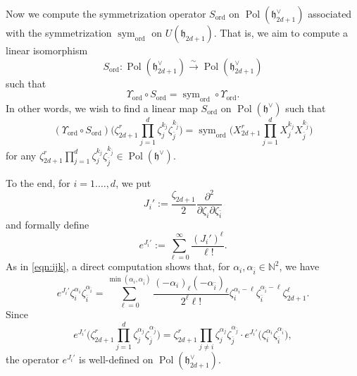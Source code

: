 \documentclass[a4paper,11pt,reqno]{amsart}
\newcommand{\frakh}{\mathfrak{h}}
\newcommand{\0}{{\bf 0}}
\newcommand{\N}{\mathbb{N}}
\newcommand{\1}{{\bf 1}}
\DeclareMathOperator{\Pol}{Pol}
\newcommand{\ord}{{\mathrm{ord}}}
\DeclareMathOperator{\To}{\longrightarrow}
\DeclareMathOperator{\sym}{sym}
\theoremstyle{plain}
\theoremstyle{definition}
\numberwithin{equation}{section}
\theoremstyle{definition}
\begin{document}
\begin{appendices}
Now we compute the symmetrization operator 
$S_{\ord}$ on  
$\Pol(\frakh_{2d+1}^\vee)$ associated with the symmetrization
$\sym_\ord$ on $U(\frakh_{2d+1})$. That is, we aim to compute
a linear isomorphism
\begin{equation*}
S_{\ord} \colon 
\Pol(\frakh_{2d+1}^\vee) \stackrel{\sim}{\To} \Pol(\frakh_{2d+1}^\vee)
\end{equation*}
 such that
\begin{equation*}
\Upsilon_{\ord} \circ S_{\ord}=
\sym_{\ord} \circ \Upsilon_{\ord}.
\end{equation*}
In other words, we wish to find a linear map
$S_{\ord}$ on $\Pol(\frakh^\vee)$
such that
\begin{equation*}
(\Upsilon_{\ord} 
\circ
S_{\ord} )
\Big(
\zeta_{2d+1}^r
\prod_{j=1}^d
\zeta_j^{k_j}\zeta_{\bar{j}}^{k_{\bar{j}}}
\Big)
=
\sym_{\ord}\big(X_{2d+1}^r\prod_{j=1}^{d}X_j^{k_j}X_{\bar{j}}^{k_{\bar{j}}} \big)
\end{equation*}
for any $\zeta_{2d+1}^r
\prod_{j=1}^d
\zeta_j^{k_j}\zeta_{\bar{j}}^{k_{\bar{j}}} \in \Pol(\frakh^\vee)$.

To the end, for $i=1.\ldots, d$, we put
\begin{equation*}
J_i'
:=
\frac{\zeta_{2d+1}}{2}\frac{\partial^2}{\partial\zeta_{i}\partial\zeta_{\bar{i}}}
\end{equation*}
and 
formally define
\begin{equation*}
e^{J_i'}:=\sum_{\ell=0}^\infty \frac{(J_{i}')^\ell}{\ell!}.
\end{equation*}
As in \eqref{eqn:ijk}, a direct computation shows that,
for $\alpha_i, \alpha_{\bar{i}} \in \N^2$, we have 
\begin{equation}\label{appendix:ijk}
e^{J_{i}'}
\zeta_i^{\alpha_i}\zeta_{\bar{i}}^{\alpha_{\bar{i}}}
=\sum_{\ell=0}^{\min(\alpha_i,\alpha_{\bar{i}})}
 \frac{(-\alpha_i)_\ell(-\alpha_{\bar{i}})_\ell}{2^\ell \ell!}
\zeta_i^{\alpha_i-\ell}\zeta_{\bar{i}}^{\alpha_{\bar{i}}-\ell}\zeta_{2d+1}^{\ell}.
\end{equation}
Since
\begin{equation}\label{appendix:eJi}
e^{J_{i}'}
\Big(
\zeta_{2d+1}^r
\prod_{j=1}^d
\zeta_j^{\alpha_j}\zeta_{\bar{j}}^{\alpha_{\bar{j}}}
\Big)
 = 
\zeta_{2d+1}^r
\prod_{j\neq i}
\zeta_j^{\alpha_j}\zeta_{\bar{j}}^{\alpha_{\bar{j}}}
\cdot
e^{J_{i}'}
\big(\zeta_i^{\alpha_i}\zeta_{\bar{i}}^{\alpha_{\bar{i}}}\big),
\end{equation}
the operator $e^{J_{i}'}$ is well-defined  on $\Pol(\frakh_{2d+1}^\vee)$.


\end{appendices}
\end{document}
